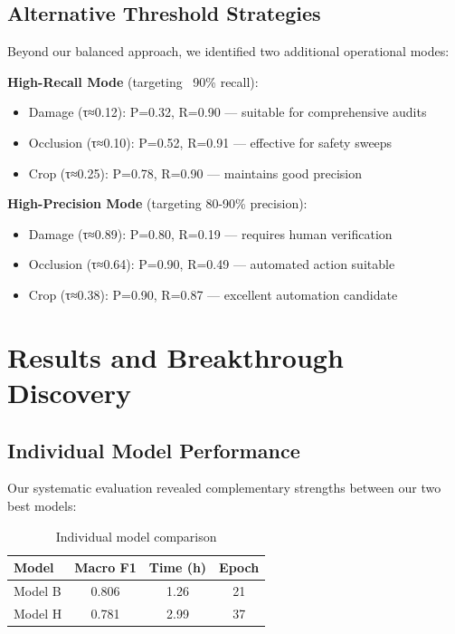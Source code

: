 \documentclass[12pt]{article}
\begin{document}
\subsection{Alternative Threshold Strategies}

Beyond our balanced approach, we identified two additional operational modes:

\textbf{High-Recall Mode} (targeting ~90\% recall):
\begin{itemize}[itemsep=1pt,parsep=0pt,topsep=2pt]
\item Damage (τ≈0.12): P=0.32, R=0.90 — suitable for comprehensive audits
\item Occlusion (τ≈0.10): P=0.52, R=0.91 — effective for safety sweeps
\item Crop (τ≈0.25): P=0.78, R=0.90 — maintains good precision
\end{itemize}

\textbf{High-Precision Mode} (targeting 80-90\% precision):
\begin{itemize}[itemsep=1pt,parsep=0pt,topsep=2pt]
\item Damage (τ≈0.89): P=0.80, R=0.19 — requires human verification
\item Occlusion (τ≈0.64): P=0.90, R=0.49 — automated action suitable
\item Crop (τ≈0.38): P=0.90, R=0.87 — excellent automation candidate
\end{itemize}

\section{Results and Breakthrough Discovery}

\subsection{Individual Model Performance}

Our systematic evaluation revealed complementary strengths between our two best models:

\begin{table}[!h]
\centering
\begin{tabular}{lccc}
\toprule
\textbf{Model} & \textbf{Macro F1} & \textbf{Time (h)} & \textbf{Epoch} \\
\midrule
Model B & 0.806 & 1.26 & 21 \\
Model H & 0.781 & 2.99 & 37 \\
\bottomrule
\end{tabular}
\caption{Individual model comparison}
\end{table}
\end{document}
